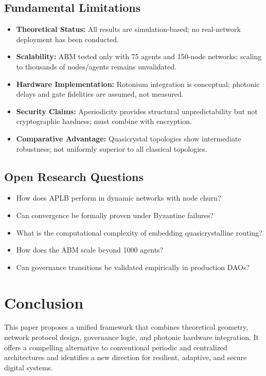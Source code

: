 \documentclass[smallextended]{svjour3}
\begin{document}
\subsection*{Fundamental Limitations}
\begin{itemize}
\item \textbf{Theoretical Status:} All results are simulation-based; no real-network deployment has been conducted.
\item \textbf{Scalability:} ABM tested only with 75 agents and 150-node networks; scaling to thousands of nodes/agents remains unvalidated.
\item \textbf{Hardware Implementation:} Rotonium integration is conceptual; photonic delays and gate fidelities are assumed, not measured.
\item \textbf{Security Claims:} Aperiodicity provides structural unpredictability but not cryptographic hardness; must combine with encryption.
\item \textbf{Comparative Advantage:} Quasicrystal topologies show intermediate robustness; not uniformly superior to all classical topologies.
\end{itemize}

\subsection*{Open Research Questions}
\begin{itemize}
\item How does APLB perform in dynamic networks with node churn?
\item Can convergence be formally proven under Byzantine failures?
\item What is the computational complexity of embedding quasicrystalline routing?
\item How does the ABM scale beyond 1000 agents?
\item Can governance transitions be validated empirically in production DAOs?
\end{itemize}

\section{Conclusion}
This paper proposes a unified framework that combines theoretical geometry, network protocol design, governance logic, and photonic hardware integration. It offers a compelling alternative to conventional periodic and centralized architectures and identifies a new direction for resilient, adaptive, and secure digital systems.
\end{document}

